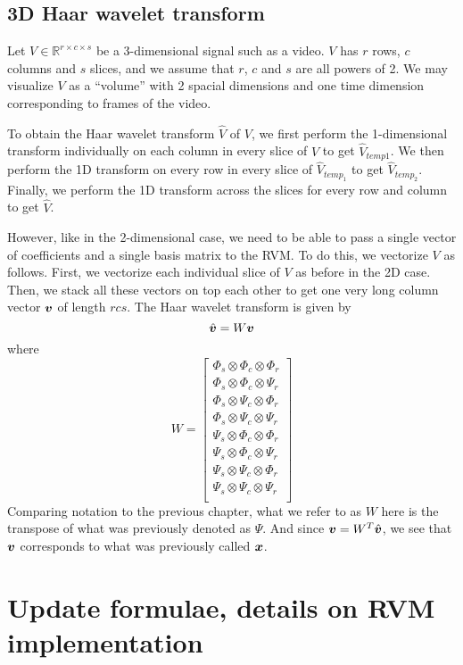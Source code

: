 \subsection{3D Haar wavelet transform}
Let $V \in \mathbb{R}^{r\times c\times s}$ be a 3-dimensional signal such as a video. 
$V$ has $r$ rows, $c$ columns and $s$ slices, and we assume that $r$, $c$ and $s$ are all powers of 2. 
We may visualize $V$ as a ``volume'' with 2 spacial dimensions and one time dimension corresponding to frames of the video.

To obtain the Haar wavelet transform $\hat V$ of $V$, we first perform the 1-dimensional transform individually on each column in every slice of $V$ to get $\hat V_{temp1}$.
We then perform the 1D transform on every row in every slice of $\hat V_{temp_1}$ to get $\hat V_{temp_2}$.
Finally, we perform the 1D transform across the slices for every row and column to get $\hat V$.

However, like in the 2-dimensional case, we need to be able to pass a single vector of coefficients and a single basis matrix to the RVM.
To do this, we vectorize $V$ as follows. 
First, we vectorize each individual slice of $V$ as before in the 2D case.
Then, we stack all these vectors on top each other to get one very long column vector $\boldsymbol v$ of length $rcs$.
The Haar wavelet transform is given by 
\begin{equation*}
\hat{\boldsymbol v} = W \boldsymbol v
\end{equation*}
where 
\begin{equation*}
W = 
\begin{bmatrix}
\Phi_s \otimes \Phi_c \otimes \Phi_r \\
\Phi_s \otimes \Phi_c \otimes \Psi_r \\
\Phi_s \otimes \Psi_c \otimes \Phi_r \\
\Phi_s \otimes \Psi_c \otimes \Psi_r \\
\Psi_s \otimes \Phi_c \otimes \Phi_r \\
\Psi_s \otimes \Phi_c \otimes \Psi_r \\
\Psi_s \otimes \Psi_c \otimes \Phi_r \\
\Psi_s \otimes \Psi_c \otimes \Psi_r \\
\end{bmatrix}
\end{equation*}
Comparing notation to the previous chapter, what we refer to as $W$ here is the transpose of what was previously denoted as $\Psi$.
And since $\boldsymbol v = W^T \hat{\boldsymbol v}$, we see that $\boldsymbol v$ corresponds to what was previously called $\boldsymbol x$. 

\section{Update formulae, details on RVM implementation}